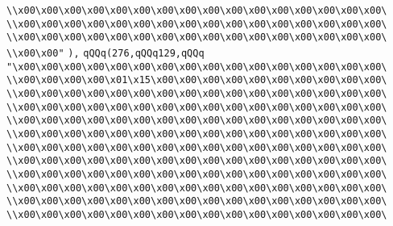 \verb|\\x00\x00\x00\x00\x00\x00\x00\x00\x00\x00\x00\x00\x00\x00\x00\x00\|\newline
\verb|\\x00\x00\x00\x00\x00\x00\x00\x00\x00\x00\x00\x00\x00\x00\x00\x00\|\newline
\verb|\\x00\x00\x00\x00\x00\x00\x00\x00\x00\x00\x00\x00\x00\x00\x00\x00\|\newline
\verb|\\x00\x00"|\newline
\verb|),|\newline
\verb|qQQq(276,qQQq129,qQQq|\newline
\verb|"\x00\x00\x00\x00\x00\x00\x00\x00\x00\x00\x00\x00\x00\x00\x00\x00\|\newline
\verb|\\x00\x00\x00\x00\x01\x15\x00\x00\x00\x00\x00\x00\x00\x00\x00\x00\|\newline
\verb|\\x00\x00\x00\x00\x00\x00\x00\x00\x00\x00\x00\x00\x00\x00\x00\x00\|\newline
\verb|\\x00\x00\x00\x00\x00\x00\x00\x00\x00\x00\x00\x00\x00\x00\x00\x00\|\newline
\verb|\\x00\x00\x00\x00\x00\x00\x00\x00\x00\x00\x00\x00\x00\x00\x00\x00\|\newline
\verb|\\x00\x00\x00\x00\x00\x00\x00\x00\x00\x00\x00\x00\x00\x00\x00\x00\|\newline
\verb|\\x00\x00\x00\x00\x00\x00\x00\x00\x00\x00\x00\x00\x00\x00\x00\x00\|\newline
\verb|\\x00\x00\x00\x00\x00\x00\x00\x00\x00\x00\x00\x00\x00\x00\x00\x00\|\newline
\verb|\\x00\x00\x00\x00\x00\x00\x00\x00\x00\x00\x00\x00\x00\x00\x00\x00\|\newline
\verb|\\x00\x00\x00\x00\x00\x00\x00\x00\x00\x00\x00\x00\x00\x00\x00\x00\|\newline
\verb|\\x00\x00\x00\x00\x00\x00\x00\x00\x00\x00\x00\x00\x00\x00\x00\x00\|\newline
\verb|\\x00\x00\x00\x00\x00\x00\x00\x00\x00\x00\x00\x00\x00\x00\x00\x00\|\newline
